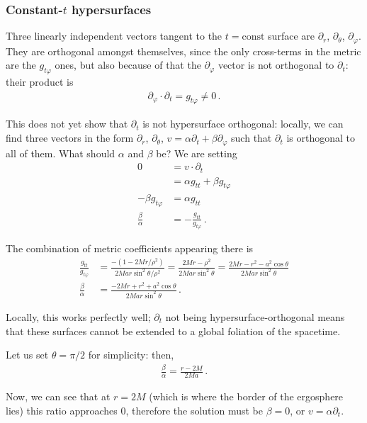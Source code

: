 \documentclass[main.tex]{subfiles}
\begin{document}
\subsubsection{Constant-$t$ hypersurfaces}

Three linearly independent vectors tangent to the \(t = \text{const}\) surface are \(\partial_r\), \(\partial_\theta \), \(\partial_\varphi \). 
They are orthogonal amongst themselves, since the only cross-terms in the metric are the \(g_{t \varphi }\) ones, but also because of that the \(\partial_\varphi \) vector is not orthogonal to \(\partial_t\): their product is %
\begin{align}
\partial_\varphi \cdot \partial_t = g_{t \varphi} \neq 0
\,.
\end{align}

This does not yet show that \(\partial_t\) is not hypersurface orthogonal: locally, we can find three vectors in the form \(\partial_r\), 
\(\partial_\theta \), \(v = \alpha \partial_t + \beta \partial_\varphi\) such that \(\partial_t\) is orthogonal to all of them. 
What should \(\alpha \) and \(\beta \) be? 
We are setting 
%
\begin{align}
0 &= v \cdot \partial_t \\
&= \alpha g_{tt} + \beta g_{t \varphi }  \\
- \beta g_{t \varphi } &= \alpha g_{tt}   \\
\frac{\beta }{\alpha} &= - \frac{ g_{t t }}{g_{t \varphi }}
\,.
\end{align}

The combination of metric coefficients appearing there is %
\begin{align}
\frac{g_{tt}}{g_{t \varphi }} &= 
\frac{- (1 - 2Mr / \rho^2)}{2Mar \sin^2 \theta / \rho^2} = \frac{2Mr - \rho^2}{2Mar \sin^2\theta } = \frac{2Mr - r^2 - a^2 \cos \theta }{2Mar \sin^2 \theta }  \\
\frac{\beta }{\alpha} &= \frac{ -2Mr + r^2 + a^2 \cos \theta}{2Mar \sin^2 \theta }
\,.
\end{align}

Locally, this works perfectly well; \(\partial_t\) not being hypersurface-orthogonal 
means that these surfaces cannot be extended to a global foliation of the spacetime. 

Let us set \(\theta = \pi /2\) for simplicity: then, 
%
\begin{align}
\frac{\beta }{\alpha} = \frac{r - 2M}{2Ma}
\,.
\end{align}

Now, we can see that at \(r = 2M\) (which is where the border of the ergosphere lies) this ratio approaches 0, therefore the 
solution must be \(\beta = 0\), or \(v = \alpha \partial_t\).
\end{document}
